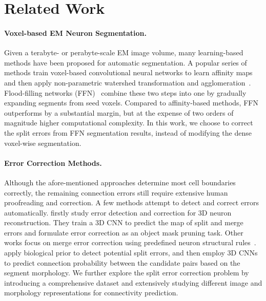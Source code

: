 \section{Related Work}
\label{sec:related-work}

 \paragraph{Voxel-based EM Neuron Segmentation.}
 Given a terabyte- or perabyte-scale EM image volume, many learning-based methods have been proposed for automatic segmentation. A popular series of methods train voxel-based convolutional neural networks to learn affinity maps~\cite{lee2021learning, sheridan2022local, funke2018large} and then apply non-parametric watershed transformation and agglomeration~\cite{beier2017multicut, wolf2018mutex}. 
 Flood-filling networks (FFN)~\cite{FFN} combine these two steps into one by gradually expanding segments from seed voxels. 
 Compared to affinity-based methods, FFN outperforms by a substantial margin, but at the expense of two orders of magnitude higher computational complexity. 
 In this work, we choose to correct the split errors from FFN segmentation results, instead of modifying the dense voxel-wise segmentation.  
 
 
 \paragraph{Error Correction Methods.}

Although the afore-mentioned approaches determine most cell boundaries correctly, the remaining connection errors still require extensive human proofreading and correction. 
A few methods attempt to detect and correct errors automatically. \citet{zung2017error} firstly study error detection and correction for 3D neuron reconstruction. They train a 3D CNN to predict the map of split and merge errors and formulate error correction as an object mask pruning task. Other works focus on merge error correction using predefined neuron structural rules~\cite{VJain-MICCAI-2020, celii2023neurd}. 
\citet{matejek2019biologically} apply biological prior to
detect potential split errors, and then employ 3D CNNs to predict connection probability between the candidate pairs based on the segment morphology. We further explore the split error correction problem by introducing a comprehensive dataset and extensively studying different image and morphology representations for connectivity prediction. 

